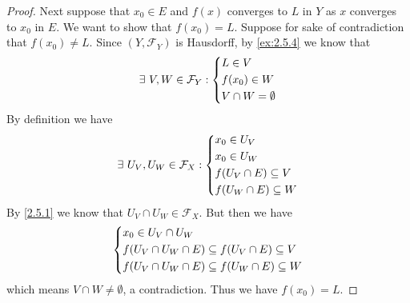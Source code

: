 \begin{proof}
  Next suppose that \(x_0 \in E\) and \(f(x)\) converges to \(L\) in \(Y\) as \(x\) converges to \(x_0\) in \(E\).
  We want to show that \(f(x_0) = L\).
  Suppose for sake of contradiction that \(f(x_0) \neq L\).
  Since \((Y, \mathcal{F}_Y)\) is Hausdorff, by \cref{ex:2.5.4} we know that
  \[
    \exists\ V, W \in \mathcal{F}_Y : \begin{dcases}
      L \in V      \\
      f(x_0) \in W \\
      V \cap W = \emptyset
    \end{dcases}
  \]
  By definition we have
  \[
    \exists\ U_V, U_W \in \mathcal{F}_X : \begin{dcases}
      x_0 \in U_V               \\
      x_0 \in U_W               \\
      f(U_V \cap E) \subseteq V \\
      f(U_W \cap E) \subseteq W
    \end{dcases}
  \]
  By \cref{2.5.1} we know that \(U_V \cap U_W \in \mathcal{F}_X\).
  But then we have
  \[
    \begin{dcases}
      x_0 \in U_V \cap U_W                                       \\
      f(U_V \cap U_W \cap E) \subseteq f(U_V \cap E) \subseteq V \\
      f(U_V \cap U_W \cap E) \subseteq f(U_W \cap E) \subseteq W
    \end{dcases}
  \]
  which means \(V \cap W \neq \emptyset\), a contradiction.
  Thus we have \(f(x_0) = L\).


\end{proof}
